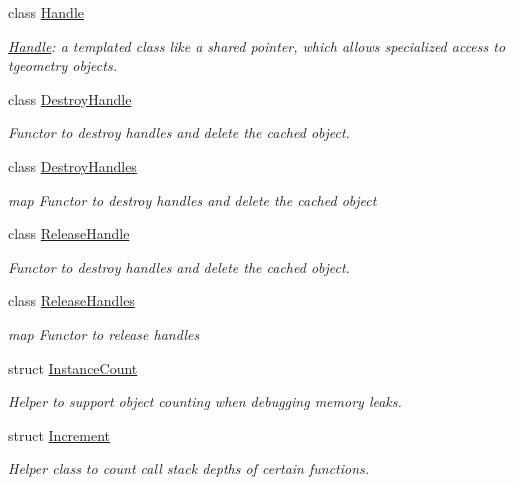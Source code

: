 \begin{DoxyCompactItemize}
class \hyperlink{class_d_d4hep_1_1_handle}{Handle}
\begin{DoxyCompactList}\small\item\em \hyperlink{class_d_d4hep_1_1_handle}{Handle}: a templated class like a shared pointer, which allows specialized access to tgeometry objects. \item\end{DoxyCompactList}\item 
class \hyperlink{class_d_d4hep_1_1_destroy_handle}{DestroyHandle}
\begin{DoxyCompactList}\small\item\em Functor to destroy handles and delete the cached object. \item\end{DoxyCompactList}\item 
class \hyperlink{class_d_d4hep_1_1_destroy_handles}{DestroyHandles}
\begin{DoxyCompactList}\small\item\em map Functor to destroy handles and delete the cached object \item\end{DoxyCompactList}\item 
class \hyperlink{class_d_d4hep_1_1_release_handle}{ReleaseHandle}
\begin{DoxyCompactList}\small\item\em Functor to destroy handles and delete the cached object. \item\end{DoxyCompactList}\item 
class \hyperlink{class_d_d4hep_1_1_release_handles}{ReleaseHandles}
\begin{DoxyCompactList}\small\item\em map Functor to release handles \item\end{DoxyCompactList}\item 
struct \hyperlink{struct_d_d4hep_1_1_instance_count}{InstanceCount}
\begin{DoxyCompactList}\small\item\em Helper to support object counting when debugging memory leaks. \item\end{DoxyCompactList}\item 
struct \hyperlink{struct_d_d4hep_1_1_increment}{Increment}
\begin{DoxyCompactList}\small\item\em Helper class to count call stack depths of certain functions. \item\end{DoxyCompactList}\item 

\end{DoxyCompactItemize}
